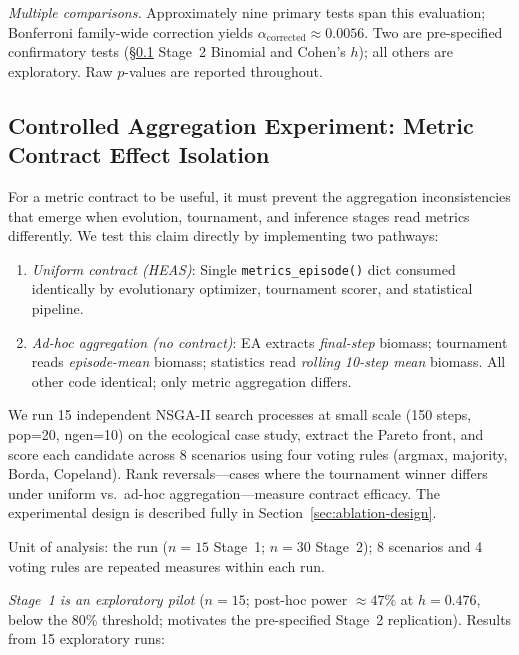 \documentclass{wscpaperproc}
\begin{document}
\emph{Multiple comparisons.} Approximately nine primary tests span this
evaluation; Bonferroni family-wide correction yields
$\alpha_{\text{corrected}} \approx 0.0056$. Two are pre-specified confirmatory
tests (\S\ref{sec:controlled-agg} Stage~2 Binomial and Cohen's $h$); all others
are exploratory. Raw $p$-values are reported throughout.

\subsection{Controlled Aggregation Experiment: Metric Contract Effect Isolation}
\label{sec:controlled-agg}

For a metric contract to be useful, it must prevent the aggregation inconsistencies
that emerge when evolution, tournament, and inference stages read metrics differently.
We test this claim directly by implementing two pathways:

\begin{enumerate}
\item \emph{Uniform contract (HEAS)}: Single \texttt{metrics\_episode()} dict consumed
identically by evolutionary optimizer, tournament scorer, and statistical pipeline.
\item \emph{Ad-hoc aggregation (no contract)}: EA extracts \emph{final-step} biomass;
tournament reads \emph{episode-mean} biomass; statistics read \emph{rolling 10-step mean}
biomass. All other code identical; only metric aggregation differs.
\end{enumerate}

We run 15 independent NSGA-II search processes at small scale (150 steps, pop=20,
ngen=10) on the ecological case study, extract the Pareto front, and score each
candidate across 8 scenarios using four voting rules (argmax, majority, Borda,
Copeland). Rank reversals---cases where the tournament winner differs under uniform
vs.\ ad-hoc aggregation---measure contract efficacy. The experimental design is
described fully in Section~\ref{sec:ablation-design}.

Unit of analysis: the run ($n\!=\!15$ Stage~1; $n\!=\!30$ Stage~2); 8 scenarios and 4 voting rules are repeated measures within each run.

\emph{Stage~1 is an exploratory pilot} ($n\!=\!15$; post-hoc power
$\approx\!47\%$ at $h\!=\!0.476$, below the 80\% threshold; motivates the
pre-specified Stage~2 replication). Results from 15 exploratory runs:
\end{document}

